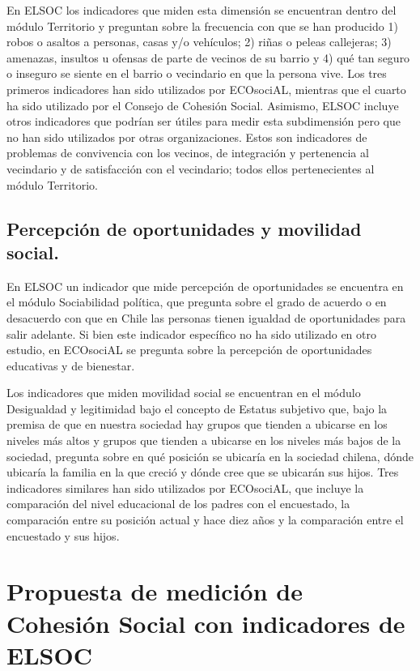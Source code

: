 \documentclass[
  12pt,
]{book}
\begin{document}
En ELSOC los indicadores que miden esta dimensión se encuentran dentro del módulo Territorio y preguntan sobre la frecuencia con que se han producido 1) robos o asaltos a personas, casas y/o vehículos; 2) riñas o peleas callejeras; 3) amenazas, insultos u ofensas de parte de vecinos de su barrio y 4) qué tan seguro o inseguro se siente en el barrio o vecindario en que la persona vive. Los tres primeros indicadores han sido utilizados por ECOsociAL, mientras que el cuarto ha sido utilizado por el Consejo de Cohesión Social. Asimismo, ELSOC incluye otros indicadores que podrían ser útiles para medir esta subdimensión pero que no han sido utilizados por otras organizaciones. Estos son indicadores de problemas de convivencia con los vecinos, de integración y pertenencia al vecindario y de satisfacción con el vecindario; todos ellos pertenecientes al módulo Territorio.

\hypertarget{percepciuxf3n-de-oportunidades-y-movilidad-social.-1}{%
\section{Percepción de oportunidades y movilidad social.}\label{percepciuxf3n-de-oportunidades-y-movilidad-social.-1}}

En ELSOC un indicador que mide percepción de oportunidades se encuentra en el módulo Sociabilidad política, que pregunta sobre el grado de acuerdo o en desacuerdo con que en Chile las personas tienen igualdad de oportunidades para salir adelante. Si bien este indicador específico no ha sido utilizado en otro estudio, en ECOsociAL se pregunta sobre la percepción de oportunidades educativas y de bienestar.

Los indicadores que miden movilidad social se encuentran en el módulo Desigualdad y legitimidad bajo el concepto de Estatus subjetivo que, bajo la premisa de que en nuestra sociedad hay grupos que tienden a ubicarse en los niveles más altos y grupos que tienden a ubicarse en los niveles más bajos de la sociedad, pregunta sobre en qué posición se ubicaría en la sociedad chilena, dónde ubicaría la familia en la que creció y dónde cree que se ubicarán sus hijos. Tres indicadores similares han sido utilizados por ECOsociAL, que incluye la comparación del nivel educacional de los padres con el encuestado, la comparación entre su posición actual y hace diez años y la comparación entre el encuestado y sus hijos.

\hypertarget{propuesta-de-mediciuxf3n-de-cohesiuxf3n-social-con-indicadores-de-elsoc}{%
\chapter{Propuesta de medición de Cohesión Social con indicadores de ELSOC}\label{propuesta-de-mediciuxf3n-de-cohesiuxf3n-social-con-indicadores-de-elsoc}}
\end{document}

